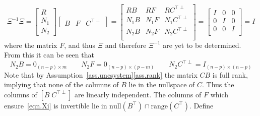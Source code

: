 \begin{equation}
  \label{eqn.xixi}
  \Xi^{-1}\Xi=
  \begin{bmatrix}
    R \\
    N_{1} \\
    N_{2}
  \end{bmatrix}
  \begin{bmatrix}
    B & F & C^{\top\perp}
  \end{bmatrix}
  =
  \begin{bmatrix}
    RB & RF & RC^{\top\perp} \\
    N_{1}B & N_{1}F & N_{1}C^{\top\perp} \\
    N_{2}B & N_{2}F & N_{2}C^{\top\perp} \\
  \end{bmatrix}
  =
  \begin{bmatrix}
    I & 0 & 0 \\
    0 & I & 0 \\
    0 & 0 & I \\
  \end{bmatrix}
  =
  I
\end{equation}
where the matrix $F$, and thus $\Xi$ and therefore $\Xi^{-1}$ are yet to be determined.
From this it can be seen that
\begin{equation}
  \label{N2B0N2F0N2CTperpI}
  N_{2}B = 0_{(n-p)\times m}
  \qquad
  N_{2}F=0_{(n-p)\times(p-m)}
  \qquad
  N_{2}C^{\top\perp}=I_{(n-p)\times(n-p)}
\end{equation}
Note that by Assumption~\ref{ass.uncsystem}\ref{ass.rank} the matrix $CB$ is full rank, implying that none of the columns of $B$ lie in the nullspace of $C$.
Thus the columns of $\left[ B \; C^{\top\perp} \right]$ are linearly independent.
The columns of $F$ which ensure\ \eqref{eqn.Xi} is invertible lie in $\text{null}(B^{\top})\cap\text{range}(C^{\top})$.
Define
